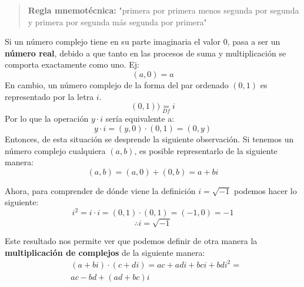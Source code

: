 \documentclass[12pt, twocolumn]{article}
\begin{document}
\begin{quote}
    \textbf{Regla mnemotécnica:} "primera por primera menos segunda por segunda y primera por segunda más segunda por primera"
\end{quote}

Si un número complejo tiene en su parte imaginaria el valor $0$, pasa a ser un \textbf{número real}, debido a que tanto en las procesos de suma y multiplicación se comporta exactamente como uno. Ej: $$(a,0)=a$$
En cambio, un número complejo de la forma del par ordenado $(0,1)$ es representado por la letra $i$.
$$\boxed{(0,1))\underset{Df}{=}i}$$
Por lo que la operación $y\cdot i$ sería equivalente a:
$$y\cdot i = (y,0)\cdot (0,1)=(0,y)$$
Entonces, de esta situación se desprende la siguiente observación. Si tenemos un número complejo cualquiera $(a,b)$, es posible representarlo de la siguiente manera:
$$(a,b)=(a,0)+(0,b)=\boxed{a+bi}$$

Ahora, para comprender de dónde viene la definición $i=\sqrt{-1}$ podemos hacer lo siguiente:
$$i^{2}=i\cdot i = (0,1)\cdot (0,1) = (-1,0) = -1 $$
$$\boxed{\therefore i = \sqrt{-1}}$$

Este resultado nos permite ver que podemos definir de otra manera la \textbf{multiplicación de complejos} de la siguiente manera:
\begin{equation*}
    \begin{aligned}
        & (a+bi)\cdot (c+di) = ac+adi + bci + bdi^{2}= \\
        & \boxed{ac-bd+(ad+bc)i}
    \end{aligned}
\end{equation*}  
\end{document}
